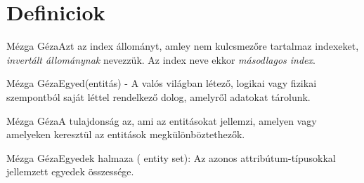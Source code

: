 \section{Definiciok}

\begin{definicio}{Mézga Géza}Azt az index állományt, amley nem kulcsmezőre tartalmaz indexeket, \textit{invertált állománynak} nevezzük. Az index neve ekkor \textit{másodlagos index}.
\end{definicio}\begin{definicio}{Mézga Géza}Egyed(entitás) - A valós világban létező, logikai vagy fizikai szempontból saját léttel rendelkező dolog, amelyről adatokat tárolunk.
\end{definicio}\begin{definicio}{Mézga Géza}A tulajdonság az, ami az entitásokat jellemzi, amelyen vagy amelyeken keresztül az entitások megkülönböztethezők.
\end{definicio}\begin{definicio}{Mézga Géza}Egyedek halmaza ( entity set): Az azonos attribútum-típusokkal jellemzett egyedek összessége.


\end{definicio}
